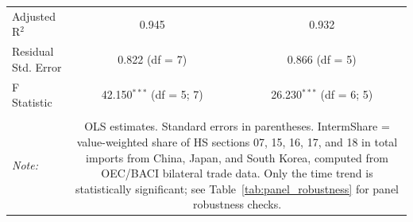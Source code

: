 \begin{table}[!htbp]
\begin{tabular}{@{\extracolsep{5pt}}lcc}
Adjusted R$^{2}$ & 0.945 & 0.932 \\ 
Residual Std. Error & 0.822 (df = 7) & 0.866 (df = 5) \\ 
F Statistic & 42.150$^{***}$ (df = 5; 7) & 26.230$^{***}$ (df = 6; 5) \\ 
\hline 
\hline \\[-1.8ex] 
\textit{Note:}  & \multicolumn{2}{p{0.72\textwidth}}{OLS estimates. Standard errors in parentheses. IntermShare = value-weighted share of HS sections 07, 15, 16, 17, and 18 in total imports from China, Japan, and South Korea, computed from OEC/BACI bilateral trade data. Only the time trend is statistically significant; see Table~\ref{tab:panel_robustness} for panel robustness checks.} \\ 
\end{tabular} 
\end{table} 
